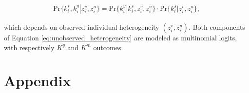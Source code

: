\documentclass[12pt, a4paper]{article}
\renewcommand{\thefigure}{\Roman{figure}}
\begin{document}
\begin{align}\label{eq:unobserved_heterogeneity}
\text{Pr}\{k_i^s,k_i^y|z_i^v,z_i^u\}=\text{Pr}\{k_i^y|k_i^s,z_i^v,z_i^u\}\cdot\text{Pr}\{k_i^s|z_i^v,z_i^u\},
\end{align}

which depends on observed individual heterogeneity $(z_i^v,z_i^u)$. Both components of Equation \ref{eq:unobserved_heterogeneity} are modeled as multinomial logits, with respectively $K^y$ and $K^m$ outcomes. 



\newpage
{}

%
 

\newpage
\setcounter{section}{0}
\renewcommand{\thesection}{\Alph{section}} 
\renewcommand{\thesubsection}{\thesection.\arabic{subsection}}
\section{Appendix\label{Sec: Preliminary}}
\setcounter{table}{0}
\renewcommand{\thetable}{A\arabic{table}}
\setcounter{figure}{0}
\renewcommand{\thefigure}{A\arabic{figure}}
\end{document}
